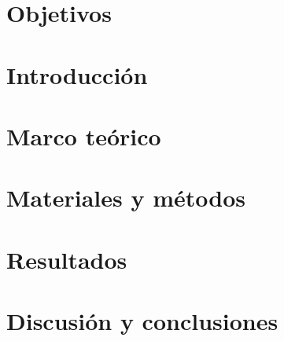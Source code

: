 \documentclass[12pt, letterpaper, spanish, twoside]{article}
\begin{document}
\renewcommand{\tablename}{Tabla}




\tableofcontents
\newpage


\section{Objetivos}


\section{Introducción}


\section{Marco teórico}


\section{Materiales y métodos}


\section{Resultados}


\section{Discusión y conclusiones}


\nocite{*}
\renewcommand{\refname}{Referencias bibliográficas}


\end{document}
